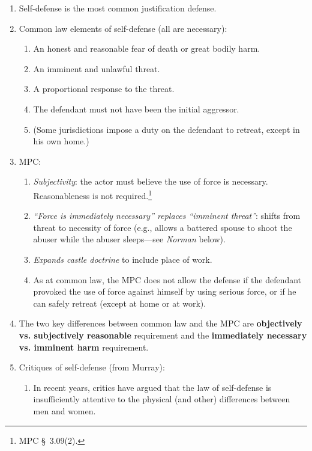 \begin{enumerate}
    \item Self-defense is the most common justification defense.
    \item Common law elements of self-defense (all are necessary):
    \begin{enumerate}
        \item An honest and reasonable fear of death or great bodily harm.
        \item An imminent and unlawful threat.
        \item A proportional response to the threat.
        \item The defendant must not have been the initial aggressor.
        \item (Some jurisdictions impose a duty on the defendant to retreat, 
        except in his own home.)
    \end{enumerate}
    \item MPC:
    \begin{enumerate}
        \item \emph{Subjectivity}: the actor must believe the use of force is 
        necessary. Reasonableness is not required.\footnote{MPC \S\ 3.09(2).}
        \item \emph{``Force is immediately necessary'' replaces 
        ``imminent threat''}: shifts from threat to necessity of force (e.g., 
        allows a battered spouse to shoot the abuser while the abuser 
        sleeps---see \emph{Norman} below).
        \item \emph{Expands castle doctrine} to include place of work.
        \item As at common law, the MPC does not allow the defense if the 
        defendant provoked the use of force against himself by using serious 
        force, or if he can safely retreat (except at home or at work).
    \end{enumerate}
    \item The two key differences between common law and the MPC are 
    \textbf{objectively vs. subjectively reasonable} requirement and the 
    \textbf{immediately necessary vs. imminent harm} requirement.
    \item Critiques of self-defense (from Murray):
    \begin{enumerate}
        \item In recent years, critics have argued that the law of 
        self-defense is insufficiently attentive to the physical (and other) 
        differences between men and women.

\end{enumerate}
\end{enumerate}
